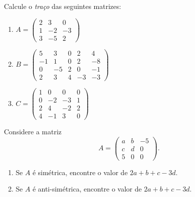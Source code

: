 \documentclass[12pt]{exam}
\begin{document}
    \vspace{.3cm}

    \questao{} Calcule o \textit{traço} das seguintes matrizes:
    \begin{enumerate}
        \item $A = \begin{pmatrix}2 & 3 & 0\\1 & -2 & -3\\3 & -5 & 2\end{pmatrix}$
        \item $B = \begin{pmatrix}5 & 3 & 0 & 2 & 4\\-1 & 1 & 0 & 2 & -8\\0 & -5 & 2 & 0 & -1\\2 & 3 & 4 & -3 & -3\end{pmatrix}$
        \item $C = \begin{pmatrix}1 & 0 & 0 & 0\\0 & -2 & -3 & 1\\2 & 4 & -2 & 2\\4 & -1 & 3 & 0\end{pmatrix}$
    \end{enumerate}

    \vspace{.3cm}

    \questao{}Considere a matriz
        \[
            A = \begin{pmatrix}a & b & -5\\c & d & 0\\5 & 0 & 0\end{pmatrix}.
        \]
        \begin{enumerate}
            \item Se $A$ é simétrica, encontre o valor de $2a + b + c - 3d$.
            \item Se $A$ é anti-simétrica, encontre o valor de $2a + b + c - 3d$.
        \end{enumerate}
\end{document}
